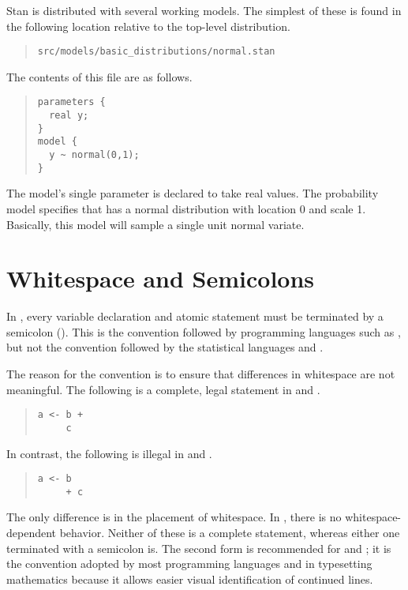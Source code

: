 Stan is distributed with several working models.  The simplest of
these is found in the following location relative to the top-level
distribution.
%
\begin{quote}
\begin{Verbatim}
src/models/basic_distributions/normal.stan
\end{Verbatim}
\end{quote}
%
The contents of this file are as follows.
%
\begin{quote}
\begin{Verbatim}
parameters {
  real y;
}
model {
  y ~ normal(0,1);
}
\end{Verbatim}
\end{quote}
%
The model's single parameter  is declared to take real values.
The probability model specifies that  has a normal
distribution with location 0 and scale 1.  Basically, this model will
sample a single unit normal variate.  

\section{Whitespace and Semicolons}

In \Stan, every variable declaration and atomic statement must be
terminated by a semicolon (\code{;}).  This is the convention followed
by programming languages such as \Cpp, but not the convention followed
by the statistical languages \R and \BUGS.

The reason for the \Cpp convention is to ensure that differences in
whitespace are not meaningful.  The following is a complete, legal
statement in \R and \BUGS.
%
\begin{quote}
\begin{Verbatim}
a <- b +
     c
\end{Verbatim}
\end{quote}
%
In contrast, the following is illegal in \R and \BUGS.
%
\begin{quote}
\begin{Verbatim}
a <- b
     + c
\end{Verbatim}
\end{quote}
%
The only difference is in the placement of whitespace.  In \Stan,
there is no whitespace-dependent behavior.  Neither of these is a
complete statement, whereas either one terminated with a semicolon is.
The second form is recommended for \Cpp and \Stan; it is the
convention adopted by most programming languages and in typesetting
mathematics because it allows easier visual identification of
continued lines.


